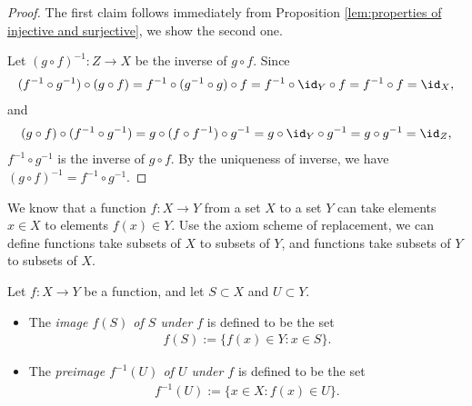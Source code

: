 \begin{proof}
    The first claim follows immediately from Proposition \ref{lem:properties of injective and surjective}, we show the second one.

    Let $(g \circ f)^{-1} : Z \to X$ be the inverse of $g \circ f$. Since
    \begin{align*}
        (f^{-1} \circ g^{-1}) \circ (g \circ f)
        = f^{-1} \circ (g^{-1} \circ g) \circ f
        = f^{-1} \circ \id_Y \circ f
        = f^{-1} \circ f
        = \id_X,
    \end{align*}
    and
    \begin{align*}
        (g \circ f) \circ (f^{-1} \circ g^{-1})
        = g \circ (f \circ f^{-1}) \circ g^{-1}
        = g \circ \id_Y \circ g^{-1}
        = g \circ g^{-1}
        = \id_Z,
    \end{align*}
    $f^{-1} \circ g^{-1}$ is the inverse of $g \circ f$. By the uniqueness of inverse, we have $(g \circ f)^{-1} = f^{-1} \circ g^{-1}$.
\end{proof}

We know that a function $f : X \to Y$ from a set $X$ to a set $Y$ can take elements $x \in X$ to elements $f(x) \in Y$. Use the axiom scheme of replacement, we can define functions take subsets of $X$ to subsets of $Y$, and functions take subsets of $Y$ to subsets of $X$.

\begin{definition}
    Let $f : X \to Y$ be a function, and let $S \subset X$ and $U \subset Y$.
    \begin{itemize}
        \item The \emph{image $f(S)$ of $S$ under $f$} is defined to be the set
        \begin{align*}
            f(S) := \{f(x) \in Y : x \in S\}.
        \end{align*}
        \item The \emph{preimage $f^{-1}(U)$ of $U$ under $f$} is defined to be the set
        \begin{align*}
            f^{-1}(U) := \{x \in X : f(x) \in U\}.
        \end{align*}
    \end{itemize}
\end{definition}

    




















